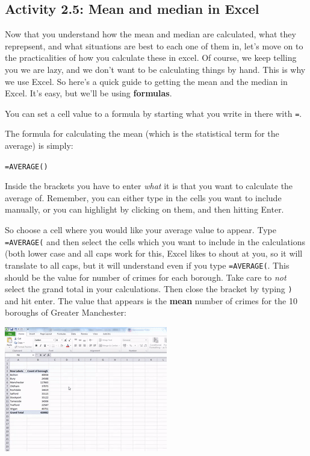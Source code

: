 \documentclass[
]{book}
\begin{document}
\hypertarget{activity-2.5-mean-and-median-in-excel}{%
\subsection{Activity 2.5: Mean and median in Excel}\label{activity-2.5-mean-and-median-in-excel}}

Now that you understand how the mean and median are calculated, what they reprepsent, and what situations are best to each one of them in, let's move on to the practicalities of how you calculate these in excel. Of course, we keep telling you we are lazy, and we don't want to be calculating things by hand. This is why we use Excel. So here's a quick guide to getting the mean and the median in Excel. It's easy, but we'll be using \textbf{formulas}.

You can set a cell value to a formula by starting what you write in there with \texttt{=}.

The formula for calculating the mean (which is the statistical term for the average) is simply:

\texttt{=AVERAGE()}

Inside the brackets you have to enter \emph{what} it is that you want to calculate the average of. Remember, you can either type in the cells you want to include manually, or you can highlight by clicking on them, and then hitting Enter.

So choose a cell where you would like your average value to appear. Type \texttt{=AVERAGE(} and then select the cells which you want to include in the calculations (both lower case and all caps work for this, Excel likes to shout at you, so it will translate to all caps, but it will understand even if you type \texttt{=AVERAGE(}. This should be the value for number of crimes for each borough. Take care to \emph{not} select the grand total in your calculations. Then close the bracket by typing \texttt{)} and hit enter. The value that appears is the \textbf{mean} number of crimes for the 10 boroughs of Greater Manchester:

\includegraphics{imgs/calc_avg.gif}
\end{document}
